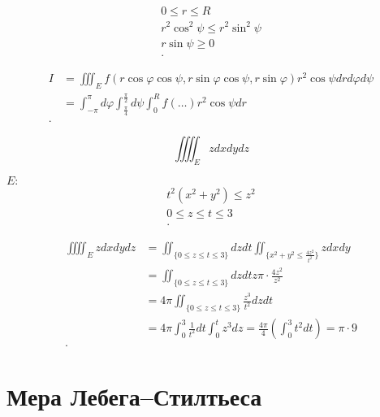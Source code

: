 \begin{example}
\begin{itemize}
            \begin{align*}
               0\leqslant r \leqslant R\\ 
                r^2\cos^2\psi \leqslant r^2\sin^2 \psi\\
                r\sin\psi \geqslant 0\\
            .\end{align*}

            \begin{align*}
                I &= \iiint_E f\left(r\cos\varphi\cos\psi, r\sin\varphi\cos\psi, r\sin\varphi  \right) r^2\cos\psi dr d\varphi d\psi \\
                &= \int_{-\pi}^{\pi}d\varphi \int_{\frac{\pi}{4}}^{\frac{\pi}{2}}d\psi \int_0^R f(\ldots)r^2\cos\psi dr \\
            .\end{align*}
        \end{itemize}
\end{example}

\begin{example}
    \[\iiiint_E z dxdydz\]

    $E:$
    \begin{align*}
       t^2(x^2 + y^2) \leqslant z^2\\
       0\leqslant z\leqslant t\leqslant 3\\ 
    .\end{align*}

    \begin{align*}
        \iiiint_E z dxdydz &= \iint_{\{0\leqslant z\leqslant t\leqslant 3\}} dzdt \iint_{\{x^2 + y^2 \leqslant \frac{4z^2}{t^2} \}} zdxdy \\
        &= \iint_{\{0\leqslant z\leqslant t\leqslant 3\}} dzdt z \pi \cdot \frac{4z^2}{z^2}\\   
        &= 4\pi \iint_{\{ 0\leqslant z \leqslant t \leqslant 3\}} \frac{z^3}{t^2}dzdt \\
        &= 4\pi \int_0^3 \frac{1}{t^2} dt \int_0^t z^3dz = \frac{4\pi}{4}\left( \int_0^3 t^2dt \right) = \pi\cdot 9  \\
    .\end{align*}


\end{example}

\section{Мера Лебега--Стилтьеса}

